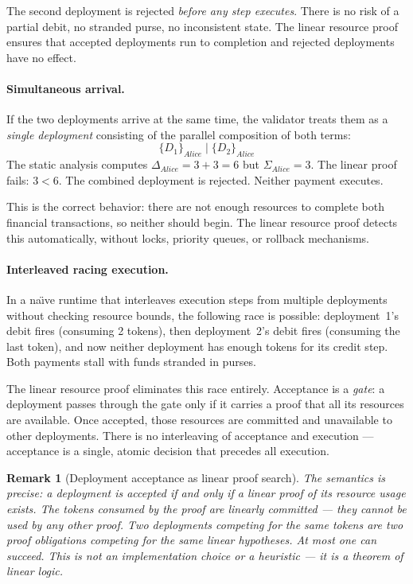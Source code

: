 \documentclass[11pt,a4paper]{article}
\newtheorem{remark}[theorem]{Remark}
\newcommand{\Par}{\mathbin{|}}
\newcommand{\signed}[2]{\{#1\}_{#2}}
\begin{document}
\noindent
The second deployment is rejected \emph{before any step
executes}.  There is no risk of a partial debit, no stranded
purse, no inconsistent state.  The linear resource proof
ensures that accepted deployments run to completion and
rejected deployments have no effect.

\paragraph{Simultaneous arrival.}
If the two deployments arrive at the same time, the validator
treats them as a \emph{single deployment} consisting of the
parallel composition of both terms:
\[
  \signed{D_1}{\mathit{Alice}} \Par \signed{D_2}{\mathit{Alice}}
\]
The static analysis computes
$\Delta_{\mathit{Alice}} = 3 + 3 = 6$ but
$\Sigma_{\mathit{Alice}} = 3$.  The linear proof fails:
$3 < 6$.  The combined deployment is rejected.  Neither
payment executes.

This is the correct behavior: there are not enough resources
to complete both financial transactions, so neither should
begin.  The linear resource proof detects this automatically,
without locks, priority queues, or rollback mechanisms.

\paragraph{Interleaved racing execution.}
In a na\"{\i}ve runtime that interleaves execution steps from
multiple deployments without checking resource bounds, the
following race is possible: deployment~1's debit fires
(consuming 2 tokens), then deployment~2's debit fires
(consuming the last token), and now neither deployment has
enough tokens for its credit step.  Both payments stall with
funds stranded in purses.

The linear resource proof eliminates this race entirely.
Acceptance is a \emph{gate}: a deployment passes through the
gate only if it carries a proof that all its resources are
available.  Once accepted, those resources are committed and
unavailable to other deployments.  There is no interleaving
of acceptance and execution --- acceptance is a single,
atomic decision that precedes all execution.

\begin{remark}[Deployment acceptance as linear proof search]
  The semantics is precise: a deployment is accepted
  \emph{if and only if} a linear proof of its resource usage
  exists.  The tokens consumed by the proof are
  \emph{linearly} committed --- they cannot be used by any
  other proof.  Two deployments competing for the same tokens
  are two proof obligations competing for the same linear
  hypotheses.  At most one can succeed.  This is not an
  implementation choice or a heuristic --- it is a theorem of
  linear logic.
\end{remark}
\end{document}
